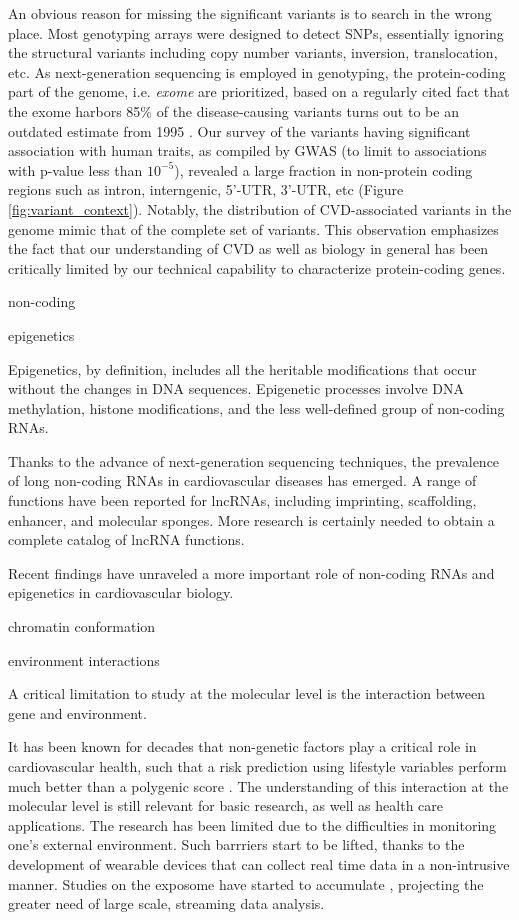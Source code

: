 \documentclass[letter]{bioinfo}
\begin{document}
An obvious reason for missing the significant variants is to search in the wrong place. Most genotyping arrays were designed to detect SNPs, essentially ignoring the structural variants including copy number variants, inversion, translocation, etc. As next-generation sequencing is employed in genotyping, the protein-coding part of the genome, i.e. \textit{exome} are prioritized, based on a regularly cited fact that the exome harbors 85\% of the disease-causing variants turns out to be an outdated estimate from 1995 \citep{Antonarakis:2001:nature}. Our survey of the variants having significant association with human traits, as compiled by GWAS (to limit to associations with p-value less than $10^{-5}$), revealed a large fraction in non-protein coding regions such as intron, interngenic, 5'-UTR, 3'-UTR, etc (Figure \ref{fig:variant_context}). Notably, the distribution of CVD-associated variants in the genome mimic that of the complete set of variants. This observation emphasizes the fact that our understanding of CVD as well as biology in general has been critically limited by our technical capability to characterize protein-coding genes. 


non-coding

epigenetics

Epigenetics, by definition, includes all the heritable modifications that occur without the changes in DNA sequences. Epigenetic processes involve DNA methylation, histone modifications, and the less well-defined group of non-coding RNAs.

Thanks to the advance of next-generation sequencing techniques, the prevalence of long non-coding RNAs in cardiovascular diseases has emerged. A range of functions have been reported for lncRNAs, including imprinting, scaffolding, enhancer, and molecular sponges. More research is certainly needed to obtain a complete catalog of lncRNA functions.


Recent findings have unraveled a more important role of non-coding RNAs and epigenetics in cardiovascular biology.

chromatin conformation \citep{Rosa-Garrido:2017:HighResolution}

environment interactions

A critical limitation to study at the molecular level is the interaction between gene  and environment.

It has been known for decades that non-genetic factors play a critical role in cardiovascular health, such that a risk prediction using lifestyle variables perform much better than a polygenic score \citep{Joyner:2011:Ten}. The understanding of this interaction at the molecular level is still relevant for basic research, as well as health care applications. The research has been limited due to the difficulties in monitoring one's external environment. Such barrriers start to be lifted, thanks to the development of wearable devices that can collect real time data in a non-intrusive manner. Studies on the exposome have started to accumulate \citep{Jiang:2018:Dynamic}, projecting the greater need of large scale, streaming data analysis.
\end{document}
